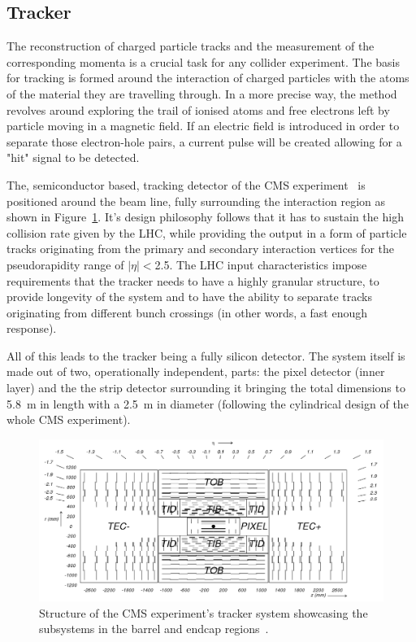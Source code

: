 \subsection{Tracker}
\hspace{10pt} The reconstruction of charged particle tracks and the measurement of the corresponding momenta is a crucial task for any collider experiment. The basis for tracking is formed around the interaction of charged particles with the atoms of the material they are travelling through. In a more precise way, the method revolves around exploring the trail of ionised atoms and free electrons left by particle moving in a magnetic field. If an electric field is introduced in order to separate those electron-hole pairs, a current pulse will be created allowing for a "hit" signal to be detected.

\hspace{10pt} The, semiconductor based, tracking detector of the CMS experiment~\cite{cms:tdr,tracker_performance,Tracker:scheme} is positioned around the beam line, fully surrounding the interaction region as shown in Figure~\ref{fig:tracker}. It's design philosophy follows that it has to sustain the high collision rate given by the LHC, while providing the output in a form of particle tracks originating from the primary and secondary interaction vertices for the pseudorapidity range of $|\eta|<$2.5. The LHC input characteristics impose requirements that the tracker needs to have a highly granular structure, to provide longevity of the system and to have the ability to separate tracks originating from different bunch crossings (in other words, a fast enough response).

\hspace{10pt} All of this leads to the tracker being a fully silicon detector. The system itself is made out of two, operationally independent, parts: the pixel detector (inner layer) and the the strip detector surrounding it bringing the total dimensions to 5.8~m in length with a 2.5~m in diameter (following the cylindrical design of the whole CMS experiment).
\hspace{10pt} 
\begin{figure}[htbp]
  \centering
    \includegraphics[width=\textwidth]{CMS_experiment/cmstracker.png}
  \caption[Structure of the CMS experiment's tracker system showcasing the subsystems in the barrel and endcap regions.]{Structure of the CMS experiment's tracker system showcasing the subsystems in the barrel and endcap regions~\cite{Tracker:scheme}.}
  \label{fig:tracker}
\end{figure}


